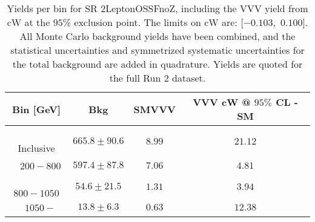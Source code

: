 \begin{table}[!htbp]
    \small
    \center
    \begin{tabular}{c||c|c|c}
    Bin [GeV] & Bkg & SMVVV & \pbox{20cm}{VVV \\ cW @ $95\%$ CL - SM \\ }\\
    \hline
    \pbox{20cm}{ ~ \\Inclusive\\ } & $665.8 \pm 90.6$ & $8.99$ & $21.12$\\
    \hline
    \pbox{20cm}{ ~ \\$200-800$\\ } & $597.4 \pm 87.8$ & $7.06$ & $4.81$\\
    \hline
    \pbox{20cm}{ ~ \\$800-1050$\\ } & $54.6 \pm 21.5$ & $1.31$ & $3.94$\\
    \hline
    \pbox{20cm}{ ~ \\$1050-$\\ } & $13.8 \pm 6.3$ & $0.63$ & $12.38$\\
\end{tabular}
    \caption{Yields per bin for SR 2LeptonOSSFnoZ, including the VVV yield from cW at the $95$\% exclusion point. The limits on cW are: [$-0.103$,~$0.100$]. All Monte Carlo background yields have been combined, and the statistical uncertainties and symmetrized systematic uncertainties for the total background are added in quadrature. Yields are quoted for the full Run 2 dataset.}
    \label{tab:2LeptonOSSFnoZ$binssignal}
\end{table}
